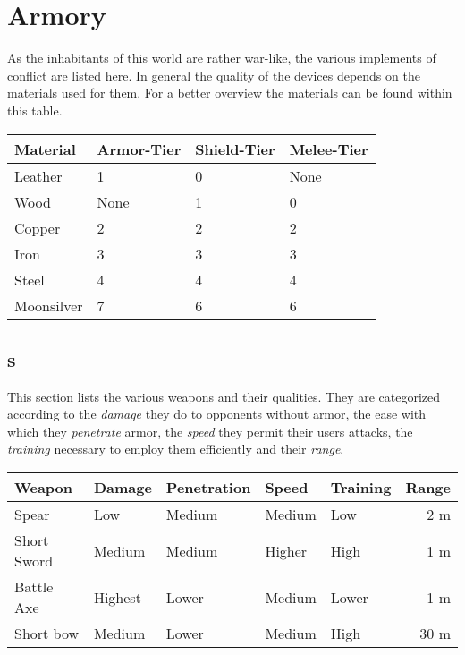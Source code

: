 \section{Armory}\label{ch:Goods:Armory}

As the inhabitants of this world are rather war-like, the various implements of
conflict are listed here. In general the quality of the devices depends on the
materials used for them. For a better overview the materials can be found
within this table.

\begin{longtable}{llll}
	\toprule
	Material   & Armor-Tier & Shield-Tier & Melee-Tier \\
	\midrule
	Leather    & 1          & 0           & None       \\
	Wood       & None       & 1           & 0          \\
	Copper     & 2          & 2           & 2          \\
	Iron       & 3          & 3           & 3          \\
	Steel      & 4          & 4           & 4          \\ %
	Moonsilver & 7          & 6           & 6          \\
	\bottomrule
\end{longtable}

\subsection{s}\label{ch:Goods:Armory:Weapons}

This section lists the various weapons and their qualities. They are
categorized according to the \emph{damage} they do to opponents without armor,
the ease with which they \emph{penetrate} armor, the \emph{speed} they permit
their users attacks, the \emph{training} necessary to employ them efficiently
and their \emph{range}.

\begin{longtable}{lllllr}
	\toprule
	Weapon
	 & Damage  & Penetration
	 & Speed   & Training    & Range \\
	\midrule
	Spear
	 & Low     & Medium
	 & Medium  & Low         & 2 m   \\
	Short Sword
	 & Medium  & Medium
	 & Higher  & High        & 1 m   \\
	Battle Axe
	 & Highest & Lower
	 & Medium  & Lower       & 1 m   \\
	Short bow
	 & Medium  & Lower
	 & Medium  & High        & 30 m  \\
	\bottomrule
\end{longtable}

